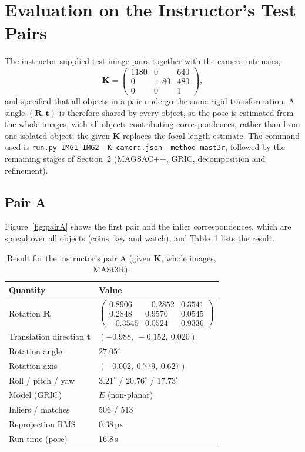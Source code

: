 \documentclass[10pt,a4paper,twocolumn]{article}
\newcommand{\R}{\mathbf{R}}
\newcommand{\tv}{\mathbf{t}}
\newcommand{\K}{\mathbf{K}}
\begin{document}
\section{Evaluation on the Instructor's Test Pairs}
The instructor supplied test image pairs together with the camera intrinsics,
\begin{equation}
  \K=\begin{pmatrix}1180&0&640\\0&1180&480\\0&0&1\end{pmatrix},
\end{equation}
and specified that all objects in a pair undergo the same rigid transformation. A single $(\R,\tv)$ is therefore shared by every object, so the pose is estimated from the whole images, with all objects contributing correspondences, rather than from one isolated object; the given $\K$ replaces the focal-length estimate. The command used is \texttt{run.py IMG1 IMG2 --K camera.json --method mast3r}, followed by the remaining stages of Section~2 (MAGSAC++, GRIC, decomposition and refinement).

\subsection*{Pair A}
Figure~\ref{fig:pairA} shows the first pair and the inlier correspondences, which are spread over all objects (coins, key and watch), and Table~\ref{tab:pairA} lists the result.



\begin{table}[!htbp]
\centering\footnotesize\setlength{\tabcolsep}{4pt}
\begin{tabular}{ll}
\toprule
Quantity & Value\\
\midrule
Rotation $\R$ & $\begin{pmatrix}0.8906&-0.2852&0.3541\\0.2848&0.9570&0.0545\\-0.3545&0.0524&0.9336\end{pmatrix}$\\[14pt]
Translation direction $\tv$ & $(-0.988,\ -0.152,\ 0.020)$\\
Rotation angle & $27.05^\circ$\\
Rotation axis & $(-0.002,\ 0.779,\ 0.627)$\\
Roll / pitch / yaw & $3.21^\circ$ / $20.76^\circ$ / $17.73^\circ$\\
Model (GRIC) & $E$ (non-planar)\\
Inliers / matches & 506 / 513\\
Reprojection RMS & 0.38\,px\\
Run time (pose) & 16.8\,s\\
\bottomrule
\end{tabular}
\caption{Result for the instructor's pair A (given $\K$, whole images, MASt3R).}\label{tab:pairA}
\end{table}
\end{document}
